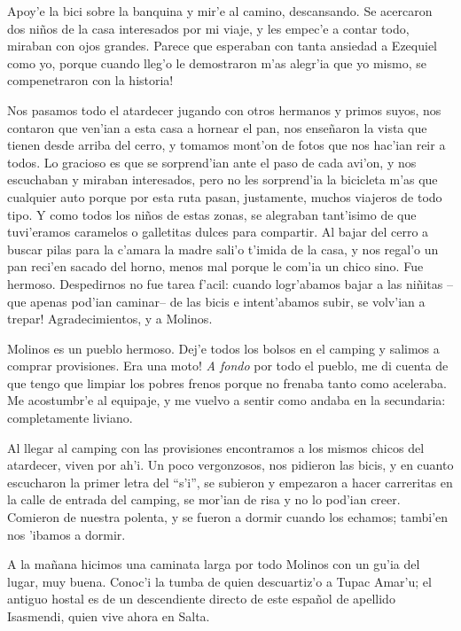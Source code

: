 Apoy'e la bici sobre la banquina y mir'e al camino, descansando. Se acercaron
dos ni\~nos de la casa interesados por mi viaje, y les empec'e a contar todo,
miraban con ojos grandes. Parece que esperaban con tanta ansiedad a Ezequiel
como yo, porque cuando lleg'o le demostraron m'as alegr'ia que yo mismo,
\textexclamdown se compenetraron con la historia!

Nos pasamos todo el atardecer jugando con otros hermanos y primos suyos, nos
contaron que ven'ian a esta casa a hornear el pan, nos ense\~naron la vista que
tienen desde arriba del cerro, y tomamos mont'on de fotos que nos hac'ian reir a
todos. Lo gracioso es que se sorprend'ian ante el paso de cada avi'on, y nos
escuchaban y miraban interesados, pero no les sorprend'ia la bicicleta m'as que
cualquier auto porque por esta ruta pasan, justamente, muchos viajeros de todo
tipo. Y como todos los ni\~nos de estas zonas, se alegraban tant'isimo de que
tuvi'eramos caramelos o galletitas dulces para compartir. Al bajar del cerro a
buscar pilas para la c'amara la madre sali'o t'imida de la casa, y nos regal'o
un pan reci'en sacado del horno, menos mal porque le com'ia un chico sino. Fue
hermoso. Despedirnos no fue tarea f'acil: cuando logr'abamos bajar a las
ni\~nitas --que apenas pod'ian caminar-- de las bicis e intent'abamos subir,
\textexclamdown se volv'ian a trepar! Agradecimientos, y a Molinos.

Molinos es un pueblo hermoso. Dej'e todos los bolsos en el camping y salimos a
comprar provisiones. \textexclamdown Era una moto! \emph{A fondo} por todo el
pueblo, me di cuenta de que tengo que limpiar los pobres frenos porque no
frenaba tanto como aceleraba. Me acostumbr'e al equipaje, y me vuelvo a sentir
como andaba en la secundaria: completamente liviano.

Al llegar al camping con las provisiones encontramos a los mismos chicos del
atardecer, viven por ah'i. Un poco vergonzosos, nos pidieron las bicis, y en
cuanto escucharon la primer letra del ``s'i'', se subieron y empezaron a hacer
carreritas en la calle de entrada del camping, se mor'ian de risa y no lo
pod'ian creer. Comieron de nuestra polenta, y se fueron a dormir cuando los
echamos; tambi'en nos 'ibamos a dormir.

A la ma\~nana hicimos una caminata larga por todo Molinos con un gu'ia del
lugar, muy buena. Conoc'i la tumba de quien descuartiz'o a Tupac Amar'u; el
antiguo hostal es de un descendiente directo de este espa\~nol de apellido
Isasmendi, quien vive ahora en Salta.

